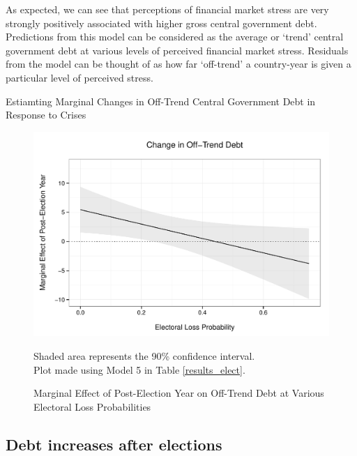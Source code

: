 \documentclass[]{article}
\begin{document}
As expected, we can see that perceptions of financial market stress are very strongly positively associated with higher gross central government debt. Predictions from this model can be considered as the average or `trend' central government debt at various levels of perceived financial market stress. Residuals from the model can be thought of as how far `off-trend' a country-year is given a particular level of perceived stress.

\begin{table}
    \caption{Estiamting Marginal Changes in Off-Trend Central Government Debt in Response to Crises}
    \label{results_elect}
    \begin{center}
        
    \end{center}
\end{table}

\begin{figure}
    \caption{Marginal Effect of Post-Election Year on Off-Trend Debt at Various Electoral Loss Probabilities}
    \label{post_loss_me}

    \begin{center}
        \includegraphics[scale=0.55]{analysis/figures/post_elect_loss.pdf}
    \end{center}

    {\scriptsize{Shaded area represents the 90\% confidence interval. \\
    Plot made using Model 5 in Table \ref{results_elect}.}}

\end{figure}

\subsection{Debt increases after elections}
\end{document}
